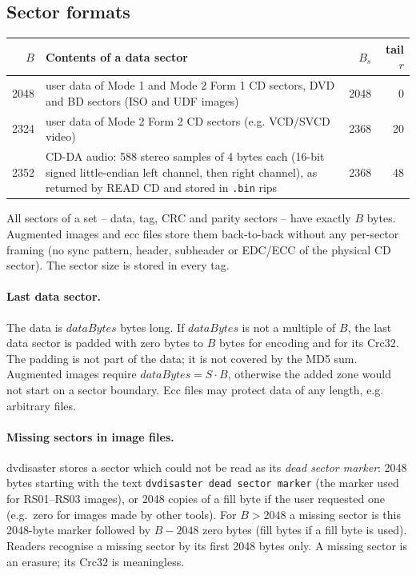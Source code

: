 \subsection{Sector formats}
\label{rs04-formats}

\begin{tabular}{|r|p{7.6cm}|r|r|}
\hline
$B$ & Contents of a data sector & $B_s$ & tail $r$\\
\hline
2048 & user data of Mode 1 and Mode 2 Form 1 CD sectors, DVD and BD
       sectors (ISO and UDF images) & 2048 & 0 \\
2324 & user data of Mode 2 Form 2 CD sectors (e.g. VCD/SVCD video) & 2368 & 20\\
2352 & CD-DA audio: 588 stereo samples of 4 bytes each (16-bit signed
       little-endian left channel, then right channel), as returned by
       READ CD and stored in {\tt .bin} rips & 2368 & 48 \\
\hline
\end{tabular}
\medskip

All sectors of a set -- data, tag, CRC and parity sectors -- have exactly
$B$ bytes. Augmented images and ecc files store them back-to-back without
any per-sector framing (no sync pattern, header, subheader or EDC/ECC of
the physical CD sector). The sector size is stored in every tag.

\paragraph{Last data sector.} The data is $dataBytes$ bytes long. If
$dataBytes$ is not a multiple of $B$, the last data sector is padded with
zero bytes to $B$ bytes for encoding and for its Crc32. The padding is not
part of the data; it is not covered by the MD5 sum. Augmented images
require $dataBytes = S \cdot B$, otherwise the added zone would not start on
a sector boundary. Ecc files may protect data of any length, e.g. arbitrary
files.

\paragraph{Missing sectors in image files.}
\label{rs04-missing}
dvdisaster stores a sector which could not be read as its {\em dead sector
marker}: 2048 bytes starting with the text {\tt dvdisaster dead sector
marker} (the marker used for RS01--RS03 images), or 2048 copies of a fill
byte if the user requested one (e.g.\ zero for images made by other
tools). For $B > 2048$ a missing sector is this 2048-byte marker followed by
$B - 2048$ zero bytes (fill bytes if a fill byte is used). Readers recognise
a missing sector by its first 2048 bytes only. A missing sector is an
erasure; its Crc32 is meaningless.

